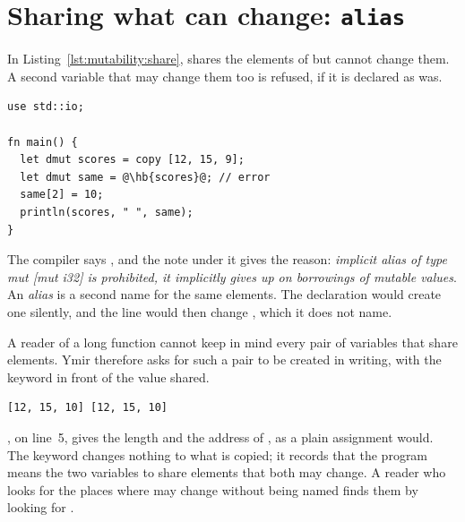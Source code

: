 \vfill\pagebreak
\section{Sharing what can change: \texttt{alias}}
\label{sec:mutability:alias}

In Listing~\ref{lst:mutability:share},  shares the elements of
 but cannot change them. A second variable that may change them
too is refused, if it is declared as  was.

\begin{lstlisting}[style=coloredverbatimError, escapechar=@, caption=Two variables that may change the same elements]
use std::io;

fn main() {
  let dmut scores = copy [12, 15, 9];
  let dmut same = @\hb{scores}@; // error
  same[2] = 10;
  println(scores, " ", same);
}
\end{lstlisting}

The compiler says , and the note under it gives the reason: \textit{implicit alias of
  type mut [mut i32] is prohibited, it implicitly gives up on borrowings of
  mutable values}. An \textit{alias} is a second name for the same elements.
The declaration would create one silently, and the line 
would then change , which it does not name.

A reader of a long function cannot keep in mind every pair of variables that
share elements. Ymir therefore asks for such a pair to be created in writing,
with the keyword  in front of the value shared.


\vspace{-10pt}%
\begin{lstlisting}[style=bashVerb]
[12, 15, 10] [12, 15, 10]
\end{lstlisting}

, on line~5, gives the length and the address of
, as a plain assignment would. The keyword changes nothing to what
is copied; it records that the program means the two variables to share
elements that both may change. A reader who looks for the places where
 may change without being named finds them by looking for
.

